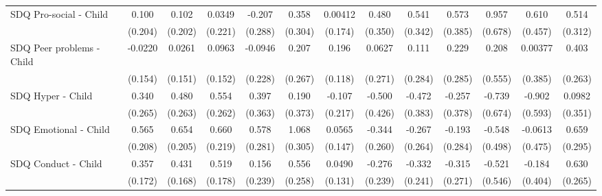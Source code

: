 {\begin{tabular}{l*{12}{c}}
\addlinespace
SDQ Pro-social - Child&       0.100         &       0.102         &      0.0349         &      -0.207         &       0.358         &     0.00412         &       0.480         &       0.541         &       0.573         &       0.957         &       0.610         &       0.514         \\
            &     (0.204)         &     (0.202)         &     (0.221)         &     (0.288)         &     (0.304)         &     (0.174)         &     (0.350)         &     (0.342)         &     (0.385)         &     (0.678)         &     (0.457)         &     (0.312)         \\
\addlinespace
SDQ Peer problems - Child&     -0.0220         &      0.0261         &      0.0963         &     -0.0946         &       0.207         &       0.196         &      0.0627         &       0.111         &       0.229         &       0.208         &     0.00377         &       0.403         \\
            &     (0.154)         &     (0.151)         &     (0.152)         &     (0.228)         &     (0.267)         &     (0.118)         &     (0.271)         &     (0.284)         &     (0.285)         &     (0.555)         &     (0.385)         &     (0.263)         \\
\addlinespace
SDQ Hyper - Child&       0.340         &       0.480         &       0.554\sym{*}  &       0.397         &       0.190         &      -0.107         &      -0.500         &      -0.472         &      -0.257         &      -0.739         &      -0.902         &      0.0982         \\
            &     (0.265)         &     (0.263)         &     (0.262)         &     (0.363)         &     (0.373)         &     (0.217)         &     (0.426)         &     (0.383)         &     (0.378)         &     (0.674)         &     (0.593)         &     (0.351)         \\
\addlinespace
SDQ Emotional - Child&       0.565\sym{**} &       0.654\sym{**} &       0.660\sym{**} &       0.578\sym{*}  &       1.068\sym{***}&      0.0565         &      -0.344         &      -0.267         &      -0.193         &      -0.548         &     -0.0613         &       0.659\sym{*}  \\
            &     (0.208)         &     (0.205)         &     (0.219)         &     (0.281)         &     (0.305)         &     (0.147)         &     (0.260)         &     (0.264)         &     (0.284)         &     (0.498)         &     (0.475)         &     (0.295)         \\
\addlinespace
SDQ Conduct - Child&       0.357\sym{*}  &       0.431\sym{*}  &       0.519\sym{**} &       0.156         &       0.556\sym{*}  &      0.0490         &      -0.276         &      -0.332         &      -0.315         &      -0.521         &      -0.184         &       0.630\sym{*}  \\
            &     (0.172)         &     (0.168)         &     (0.178)         &     (0.239)         &     (0.258)         &     (0.131)         &     (0.239)         &     (0.241)         &     (0.271)         &     (0.546)         &     (0.404)         &     (0.265)         \\
\bottomrule
\end{tabular}
}

